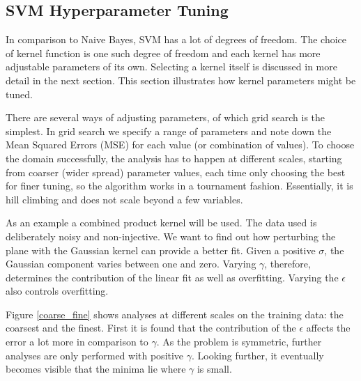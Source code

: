 \documentclass[12pt,notitlepage,twoside]{scrreprt}
\begin{document}
\subsection{SVM Hyperparameter Tuning}
\label{sec:tuning}
In comparison to Naive Bayes, SVM has a lot of degrees of freedom. The choice of kernel function is
one such degree of freedom and each kernel has more adjustable parameters of its own. Selecting a kernel 
itself is discussed in more detail in the next section. This section illustrates how
kernel parameters might be tuned. 

There are several ways of adjusting parameters, of which grid search is the simplest. In
grid search we specify a range of parameters and note down the Mean Squared Errors (MSE) for each value (or
combination of values). To choose the domain successfully, the analysis has to happen at
different scales, starting from coarser (wider spread) parameter values, each time only
choosing the best for finer tuning, so the algorithm works in a tournament fashion.
Essentially, it is hill climbing and does not scale beyond a few variables.

As an example a combined product kernel will be used. The data used is deliberately noisy
and non-injective. We want to find out how perturbing the plane with the Gaussian kernel can provide a better fit. 
Given a positive $\sigma$, the Gaussian component varies between one and zero.
Varying $\gamma$, therefore, determines the contribution of the linear fit as well as overfitting.
Varying the $\epsilon$ also controls overfitting.

Figure \ref{coarse_fine} shows analyses at different scales on the training data: the coarsest and the finest.
First it is found that the
contribution of the $\epsilon$ affects the error a lot more in comparison to $\gamma$. As the
problem is symmetric, further analyses are only performed with positive $\gamma$. Looking
further, it eventually becomes visible that the minima lie where $\gamma$ is small. 
\end{document}
